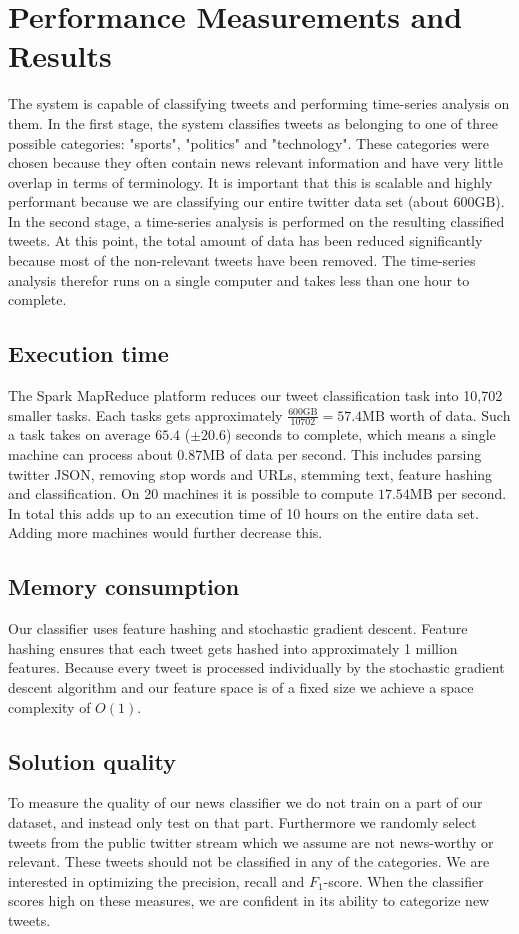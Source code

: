 \documentclass{llncs}
\begin{document}
\section{Performance Measurements and Results}
The system is capable of classifying tweets and performing time-series analysis on them. In the first stage, the system classifies tweets as belonging to one of three possible categories: "sports", "politics" and "technology". These categories were chosen because they often contain news relevant information and have very little overlap in terms of terminology. It is important that this is scalable and highly performant because we are classifying our entire twitter data set (about $600\text{GB}$). In the second stage, a time-series analysis is performed on the resulting classified tweets. At this point, the total amount of data has been reduced significantly because most of the non-relevant tweets have been removed. The time-series analysis therefor runs on a single computer and takes less than one hour to complete.

\subsection{Execution time}
The Spark MapReduce platform reduces our tweet classification task into 10,702 smaller tasks. Each tasks gets approximately $\frac{600\text{GB}}{10702} = 57.4\text{MB}$ worth of data. Such a task takes on average $65.4$ ($\pm 20.6$) seconds to complete, which means a single machine can process about $0.87\text{MB}$ of data per second. This includes parsing twitter JSON, removing stop words and URLs, stemming text, feature hashing and classification. On 20 machines it is possible to compute $17.54\text{MB}$ per second. In total this adds up to an execution time of 10 hours on the entire data set. Adding more machines would further decrease this.

\subsection{Memory consumption}
Our classifier uses feature hashing and stochastic gradient descent. Feature hashing ensures that each tweet gets hashed into approximately 1 million features. Because every tweet is processed individually by the stochastic gradient descent algorithm and our feature space is of a fixed size we achieve a space complexity of $O(1)$.

\subsection{Solution quality}
To measure the quality of our news classifier we do not train on a part of our dataset, and instead only test on that part. Furthermore we randomly select tweets from the public twitter stream which we assume are not news-worthy or relevant. These tweets should not be classified in any of the categories. We are interested in optimizing the precision, recall and $F_1$-score. When the classifier scores high on these measures, we are confident in its ability to categorize new tweets.
\end{document}
